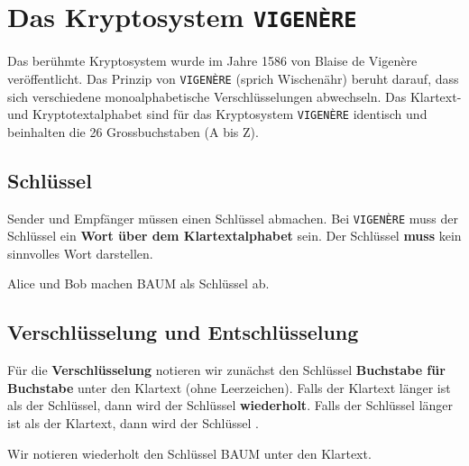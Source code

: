 \section{Das Kryptosystem \texttt{VIGENÈRE}}

Das berühmte Kryptosystem wurde im Jahre 1586 von Blaise de Vigenère veröffentlicht. Das Prinzip von \texttt{VIGENÈRE} (sprich Wischenähr) beruht darauf, dass sich verschiedene monoalphabetische Verschlüsselungen abwechseln. Das Klartext- und Kryptotextalphabet sind für das Kryptosystem \texttt{VIGENÈRE} identisch und beinhalten die \num{26} Grossbuchstaben (A bis Z).

\subsection{Schlüssel}

Sender und Empfänger müssen einen Schlüssel abmachen. Bei \texttt{VIGENÈRE} muss der Schlüssel ein \textbf{Wort über dem Klartextalphabet} sein. Der Schlüssel \textbf{muss} kein sinnvolles Wort darstellen.
 
 \begin{example}
Alice und Bob machen BAUM als Schlüssel ab.
 \end{example}

\subsection{Verschlüsselung und Entschlüsselung}

Für die \textbf{Verschlüsselung} notieren wir zunächst den Schlüssel \textbf{Buchstabe für Buchstabe} unter den Klartext (ohne Leerzeichen).  Falls der Klartext länger ist als der Schlüssel, dann wird der Schlüssel \textbf{wiederholt}. Falls der Schlüssel länger ist als der Klartext, dann wird der Schlüssel .

\begin{example}
\label{encrypt-poly-1-example}
Wir notieren wiederholt den Schlüssel BAUM unter den Klartext.
\end{example}

\begin{table}[H]
\centering
{}
\end{table}

